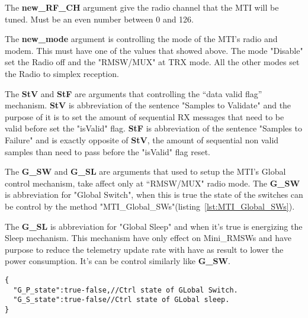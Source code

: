 The \textbf{new\_RF\_CH} argument give the radio channel that the MTI will be tuned. Must be an even number between 0 and 126.

The \textbf{new\_mode} argument is controlling the mode of the MTI's radio and modem.
This must have one of the values that showed above. The mode "Disable" set the Radio off and the "RMSW/MUX" at TRX mode.
All the other modes set the Radio to simplex reception.

The \textbf{StV} and \textbf{StF} are arguments that controlling the ``data valid flag'' mechanism.
\textbf{StV} is abbreviation of the sentence "Samples to Validate" and the purpose of it is to set the amount of sequential RX messages that need to be valid before set the "isValid" flag.
\textbf{StF} is abbreviation of the sentence "Samples to Failure" and is exactly opposite of \textbf{StV}, the amount of sequential non valid samples than need to pass before the "isValid" flag reset.

The \textbf{G\_SW} and \textbf{G\_SL} are arguments that used to setup the MTI's Global control mechanism, take affect only at ``RMSW/MUX" radio mode.
The \textbf{G\_SW} is abbreviation for "Global Switch", when this is true the state of the switches can be control by the method "MTI\_Global\_SWs"(listing~\ref{lst:MTI_Global_SWs}).

The \textbf{G\_SL} is abbreviation for "Global Sleep" and when it's true is energizing the Sleep mechanism. 
This mechanism have only effect on Mini\_RMSWs and have purpose to reduce the telemetry update rate with have as result to lower the power consumption.
It's can be control similarly like \textbf{G\_SW}.

\begin{lstlisting}[frame=single,caption=Argument for MTI\_Global\_SWs(), label=lst:MTI_Global_SWs]
{
  "G_P_state":true-false,//Ctrl state of GLobal Switch.
  "G_S_state":true-false//Ctrl state of GLobal sleep.
}
\end{lstlisting}

